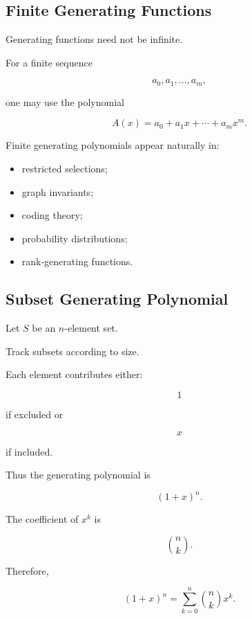 \subsection{Finite Generating Functions}
\label{subsec:finite-generating-functions}

Generating functions need not be infinite.

For a finite sequence

\[
a_0,a_1,\ldots,a_m,
\]

one may use the polynomial

\[
\boxed{
A(x)
=
a_0+a_1x+\cdots+a_mx^m.
}
\]

Finite generating polynomials appear naturally in:

\begin{itemize}
    \item restricted selections;
    \item graph invariants;
    \item coding theory;
    \item probability distributions;
    \item rank-generating functions.
\end{itemize}

\subsection{Subset Generating Polynomial}
\label{subsec:subset-generating-polynomial}

Let \(S\) be an \(n\)-element set.

Track subsets according to size.

Each element contributes either:

\[
1
\]

if excluded or

\[
x
\]

if included.

Thus the generating polynomial is

\[
\boxed{
(1+x)^n.
}
\]

The coefficient of \(x^k\) is

\[
\binom{n}{k}.
\]

Therefore,

\[
\boxed{
(1+x)^n
=
\sum_{k=0}^{n}
\binom{n}{k}x^k.
}
\]

